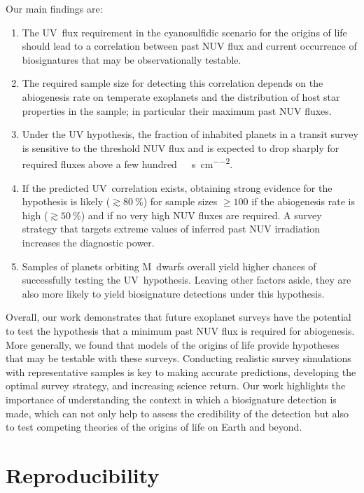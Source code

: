 \documentclass[twocolumn,twocolappendix,linenumbers]{aastex631}
\begin{document}
Our main findings are:
\begin{enumerate}
    \item The UV~flux requirement in the cyanosulfidic scenario for the origins of life should lead to a correlation between past \gls{NUV} flux and current occurrence of biosignatures that may be observationally testable.
    \item The required sample size for detecting this correlation depends on the abiogenesis rate on temperate exoplanets and the distribution of host star properties in the sample; in particular their maximum past \gls{NUV} fluxes.
    \item Under the UV hypothesis, the fraction of inhabited planets in a transit survey is sensitive to the threshold \gls{NUV} flux and is expected to drop sharply for required fluxes above a few hundred~\SI{}{\erg\per\second\per\centi\meter\squared}.
    \item If the predicted UV~correlation exists, obtaining strong evidence for the hypothesis is likely ($\gtrsim \SI{80}{\percent}$) for sample sizes $\geq 100$ if the abiogenesis rate is high ($\gtrsim \SI{50}{\percent}$) and if no very high \gls{NUV} fluxes are required.
    A survey strategy that targets extreme values of inferred past \gls{NUV} irradiation increases the diagnostic power.
    \item Samples of planets orbiting M~dwarfs overall yield higher chances of successfully testing the UV~hypothesis.
        Leaving other factors aside, they are also more likely to yield biosignature detections under this hypothesis.


\end{enumerate}

Overall, our work demonstrates that future exoplanet surveys have the potential to test the hypothesis that a minimum past \gls{NUV} flux is required for abiogenesis.
More generally, we found that models of the origins of life provide hypotheses that may be testable with these surveys.
Conducting realistic survey simulations with representative samples is key to making accurate predictions, developing the optimal survey strategy, and increasing science return.
Our work highlights the importance of understanding the context in which a biosignature detection is made, which can not only help to assess the credibility of the detection but also to test competing theories of the origins of life on Earth and beyond.

%

\section*{Reproducibility}


\end{document}
